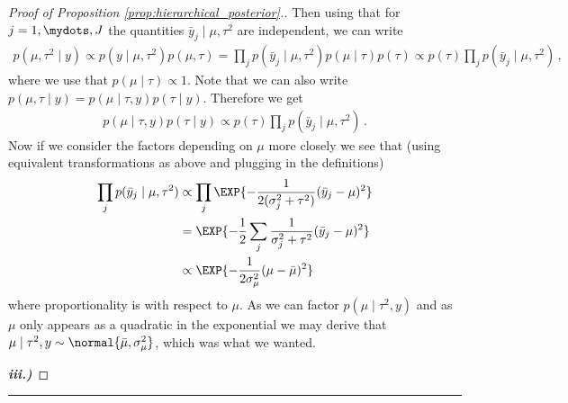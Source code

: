 \begin{proof}[Proof of Proposition \ref{prop:hierarchical_posterior}.]
  Then using that for $j=1,\mydots,J$ the quantities $\bar{y}_j \mid \mu, \tau^2$ are independent, we can write
  \begin{align*}
    p(\mu, \tau^2 \mid y) \propto p(y \mid \mu, \tau^2) p(\mu, \tau) = \prod_j p(\bar{y}_j \mid \mu, \tau^2) p(\mu \mid \tau) p(\tau) \propto p(\tau) \prod_j p(\bar{y}_j \mid \mu, \tau^2) \,,
  \end{align*}
  where we use that $p(\mu \mid \tau) \propto 1$.
  Note that we can also write $p(\mu, \tau \mid y) = p(\mu \mid \tau, y) p(\tau \mid y)$.
  Therefore we get
  \begin{align*}
    p(\mu \mid \tau, y) p(\tau \mid y) \propto p(\tau) \prod_j p(\bar{y}_j \mid \mu, \tau^2) \,.
  \end{align*}
  Now if we consider the factors depending on $\mu$ more closely we see that (using equivalent transformations as above and plugging in the definitions)
  \begin{align*}
    \prod_j p(\bar{y}_j \mid \mu, \tau^2) &\propto \prod_j \EXP{-\frac{1}{2(\sigma_j^2 + \tau^2)}(\bar{y}_j - \mu)^2}\\
    &=\EXP{-\frac{1}{2}\sum_j \frac{1}{\sigma_j^2 + \tau^2}(\bar{y}_j - \mu)^2}\\
    &\propto \EXP{-\frac{1}{2 \sigma_\mu^2} (\mu - \bar{\mu})^2}
  \end{align*}
  where proportionality is with respect to $\mu$.
  As we can factor $p(\mu \mid \tau^2, y)$ and as $\mu$ only appears as a quadratic in the exponential we may derive that $\mu \mid \tau^2, y \sim \normal{\bar{\mu}, \sigma_\mu^2}$, which was what we wanted.

  \noindent
  \textbf{\emph{iii.)}}

\end{proof}
\textcolor{red}{\hrule}
